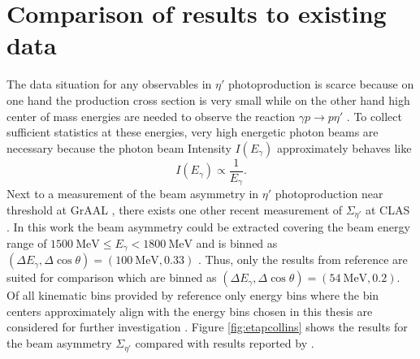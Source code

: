 \section{Comparison of results to existing data}
The data situation for any observables in $\eta'$ photoproduction is scarce because on one hand the production cross section is very small while on the other hand high center of mass energies are needed to observe the reaction $\gamma p \to p\eta'$ \cite{pdg}.  To collect sufficient statistics at these energies, very high energetic photon beams are necessary because the photon beam Intensity $I(E_\gamma)$ approximately behaves like \cite{leo}
\begin{equation}
	I(E_\gamma)\propto\frac{1}{E_\gamma}.
	\label{eq:int}
\end{equation} 
Next to a measurement of the beam asymmetry in $\eta'$ photoproduction near threshold at GrAAL \cite{thresh}, there exists one other recent measurement of $\Sigma_{\eta'}$ at CLAS \cite{collins}. In this work the beam asymmetry could be extracted covering the beam energy range of $\SI{1500}{\mega\eV}\leq E_\gamma<\SI{1800}{\mega\eV}$ and is binned as $\left(\Delta E_\gamma,\Delta\cos\theta\right)=\left(\SI{100}{\mega\eV},0.33\right)$ . Thus, only the results from reference \cite{collins} are suited for comparison which are binned as $\left(\Delta E_\gamma,\Delta\cos\theta\right)=\left(\SI{54}{\mega\eV},0.2\right)$. Of all kinematic bins provided by reference \cite{collins} only energy bins where the bin centers approximately align with the energy bins chosen in this thesis are considered for further investigation .
Figure \ref{fig:etapcollins} shows the results for the beam asymmetry $\Sigma_{\eta'}$ compared with results reported by \cite{collins}.
